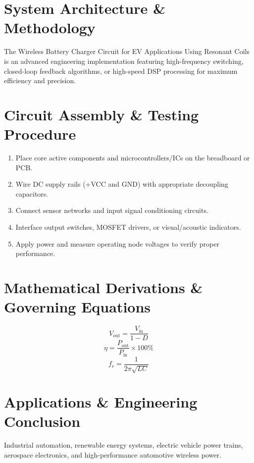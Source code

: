 \documentclass[11pt,a4paper]{article}
\begin{document}
\section{System Architecture \& Methodology}
The Wireless Battery Charger Circuit for EV Applications Using Resonant Coils is an advanced engineering implementation featuring high-frequency switching, closed-loop feedback algorithms, or high-speed DSP processing for maximum efficiency and precision.

\section{Circuit Assembly \& Testing Procedure}
\begin{enumerate}
    \item Place core active components and microcontrollers/ICs on the breadboard or PCB.
    \item Wire DC supply rails (+VCC and GND) with appropriate decoupling capacitors.
    \item Connect sensor networks and input signal conditioning circuits.
    \item Interface output switches, MOSFET drivers, or visual/acoustic indicators.
    \item Apply power and measure operating node voltages to verify proper performance.
\end{enumerate}

\section{Mathematical Derivations \& Governing Equations}
\begin{equation}
V_{\text{out}} = \frac{V_{\text{in}}}{1 - D}
\end{equation}
\begin{equation}
\eta = \frac{P_{\text{out}}}{P_{\text{in}}} \times 100\%
\end{equation}
\begin{equation}
f_r = \frac{1}{2\pi \sqrt{L C}}
\end{equation}

\section{Applications \& Engineering Conclusion}
Industrial automation, renewable energy systems, electric vehicle power trains, aerospace electronics, and high-performance automotive wireless power.
\end{document}
